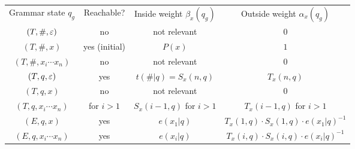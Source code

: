 \newcommand\mystrut{\rule[-0.6em]{0pt}{1.8em}}%
\newcommand\mute{\color{black!30}}
\begin{center}\begin{tabular}{|c|c||c|c|}%
 \hline\mystrut
 Grammar state $q_g$ & Reachable? & Inside weight $\beta_x(q_g)$ & Outside weight $\alpha_x(q_g)$
 \\\hhline{|=|=#=|=|}\mystrut
 \mute$(T,\#,\varepsilon)$ & \mute no & \mute not relevant & \mute0
 \\\hline\mystrut
 $(T,\#,x)$ & yes (initial) & $P(x)$ & $1$
 \\\hline\mystrut
 \mute$(T,\#,x_i\cdots x_n)$ & \mute no & \mute not relevant & \mute0
 \\\hline\mystrut
 $(T,q,\varepsilon)$ & yes & $t(\#|q)=S_x(n,q)$ & $T_x(n,q)$
 \\\hline\mystrut
 \mute$(T,q,x)$ & \mute no & \mute not relevant & \mute0
 \\\hline\mystrut
 $(T,q,x_i\cdots x_n)$ & for $i>1$ & $S_x(i-1,q)$ for $i>1$ & $T_x(i-1,q)$ for $i>1$
 \\\hhline{|=|=#=|=|}\mystrut
 $(E,q,x)$ & yes & $e(x_1|q)$ & $T_x(1,q) \cdot S_x(1,q) \cdot e(x_1|q)^{-1}$
 \\\hline\mystrut
 $(E,q,x_i\cdots x_n)$ & yes & $e(x_i|q)$ & $T_x(i,q) \cdot S_x(i,q) \cdot e(x_i|q)^{-1}$
 \\\hline
\end{tabular}\end{center}

\endinput
\clearpage
Let $c$ be an $V^*$-corpus. For all $q,q'\in Q$ and $v\in V$, the complete-data
corpus is defined by
\begin{align*}
 c\!\dangle{\omega,\mu_\uh}\mbig\kla{\#,(\#,T)} &= c(\eps), \\
 c\!\dangle{\omega,\mu_\uh}\mbig\kla{q,(\#,T)} &= \sum_{x\in\operatorname{supp}(h)\setminus\brc\eps} c(x) \cdot R_x(1,q), \\
 c\!\dangle{\omega,\mu_\uh}\mbig\kla{\#,(q,T)} &= \sum_{x\in\operatorname{supp}(h)\setminus\brc\eps} c(x) \cdot R_x\mbig\kla{\abs x,q}, \\
 c\!\dangle{\omega,\mu_\uh}\mbig\kla{q',(q,T)} &= \sum_{x\in\operatorname{supp}(h)\setminus\brc\eps} c(x) \cdot \sum_{i\in\brc{1,\ldots,\abs x-1}} U_x(i,q,q'), \\
 c\!\dangle{\omega,\mu_\uh}\mbig\kla{v,(q,E)} &= \sum_{x\in\operatorname{supp}(h)\setminus\brc\eps} c(x) \cdot \sum_{i\in\brc{1,\ldots,\abs x}: x_i=v} R_x(i,q), \\
\end{align*}
